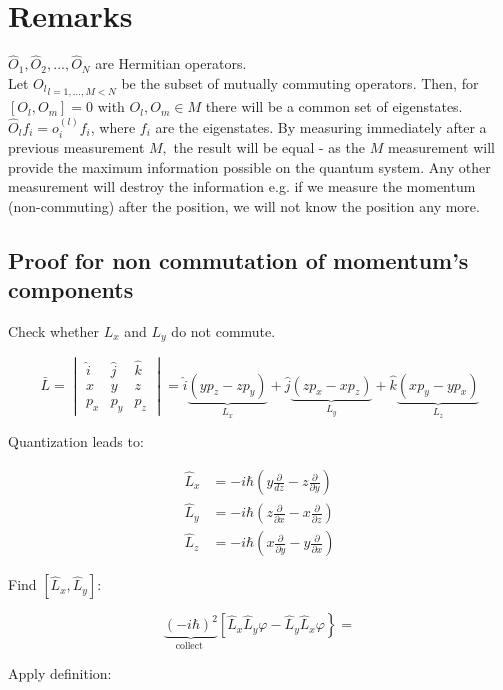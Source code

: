 \section{Remarks}
$\hat{O}_1,\hat{O}_2,...,\hat{O}_N$ are Hermitian operators.\\
Let ${O_l}_{l=1,...,M<N}$ be the subset of mutually commuting operators. Then, for $[O_l,O_m]=0$ with $O_l,O_m \in M$ there will be a common set of eigenstates.\\
\noindent
$\hat{O}_lf_i=o_i^{(l)}f_i$, where $f_i$ are the eigenstates.
By measuring immediately after a previous measurement $M,$ the result will be equal - as the $M$ measurement will provide the maximum information possible on the quantum system.
Any other measurement will destroy the information e.g. if we measure the momentum (non-commuting) after the position, we will not know the position any more.

	\subsection{Proof for non commutation of momentum's components}
	Check whether $L_x$ and $L_y$ do not commute.

	$$\bar{L}=\begin{vmatrix}\hat{i}& \hat{j}& \hat{k} \\ x& y& z \\ p_{x}& p_{y}& p_{z}\end{vmatrix}=\hat{i} \underbrace{\left(y p_{z}-z p_{y}\right)}_{L_{x}}+\hat{j}\underbrace{(z p_{x}-x p_{z})}_{L_{y}}+\hat{k} \underbrace{\left(x p_{y}-y p_{x}\right)}_{L_{z}}$$

	Quantization leads to:

	\begin{align*}
		\hat{L}_{x}&=-i \hbar\left(y \frac{\partial}{d z}-z \frac{\partial}{\partial y}\right) \\
		\hat{L}_{y}&=-i \hbar\left(z \frac{\partial}{\partial x}-x \frac{\partial}{\partial z}\right)\\
		\hat{L}_{z}&=-i \hbar\left(x \frac{\partial}{\partial y}-y \frac{\partial}{\partial x}\right)
	\end{align*}

	Find $\left[\hat{L}_{x}, \hat{L}_{y}\right]$:

	$$\underbrace{(-i \hbar)^{2}}_{\text {collect }}\left[\hat{L}_{x} \hat{L}_{y} \varphi-\hat{L}_{y} \hat{L}_{x}\varphi\right\}=$$

	Apply definition:

